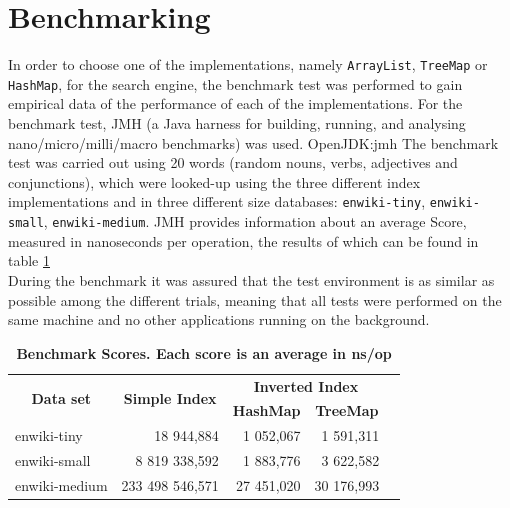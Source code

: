 \section{Benchmarking}
In order to choose one of the implementations, namely {\tt ArrayList}, {\tt TreeMap} or {\tt HashMap}, for the search engine, the benchmark test was performed to gain empirical data of the performance of each of the implementations. For the benchmark test, JMH (a Java harness for building, running, and analysing nano/micro/milli/macro benchmarks) was used. {OpenJDK:jmh} The benchmark test was carried out using 20 words (random nouns, verbs, adjectives and conjunctions), which were looked-up using the three different index implementations and in three different size databases: {\tt enwiki-tiny}, {\tt enwiki-small}, {\tt enwiki-medium}. JMH provides information about an average Score, measured in nanoseconds per operation, the results of which can be found in table \ref{table:result}\\
During the benchmark it was assured that the test environment is as similar as possible among the different trials, meaning that all tests were performed on the same machine and no other applications running on the background.


\begin{table}[!h]
    \centering
    \caption{\textbf{Benchmark Scores. Each score is an average in ns/op}}
    \begin{tabular}{|l|r|r|r|l}
        \cline{1-4}
        \multicolumn{1}{|c|}{\multirow{2}{*}{\textbf{Data set}}} & \multicolumn{1}{c|}{\multirow{2}{*}{\textbf{Simple Index}}} & \multicolumn{2}{c|}{\textbf{Inverted Index}}                                  &  \\ \cline{3-4}
        \multicolumn{1}{|c|}{}                                   & \multicolumn{1}{c|}{}                                       & \multicolumn{1}{c|}{\textbf{HashMap}} & \multicolumn{1}{c|}{\textbf{TreeMap}} &  \\ \cline{1-4}
        enwiki-tiny                                              & 18 944,884                                                  & 1 052,067                             & 1 591,311                             &  \\ \cline{1-4}
        enwiki-small                                             & 8 819 338,592                                               & 1 883,776                             & 3 622,582                             &  \\ \cline{1-4}
        enwiki-medium                                            & 233 498 546,571                                             & 27 451,020                            & 30 176,993                            &  \\ \cline{1-4}
    \end{tabular}
    \label{table:result}
\end{table}

